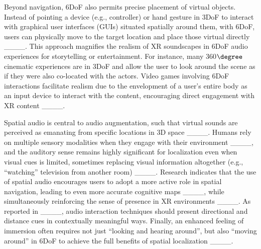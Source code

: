 Beyond navigation, 6DoF also permits precise placement of virtual objects. Instead of pointing a device (e.g., controller) or hand gesture in 3DoF to interact with graphical user interfaces (GUIs) situated spatially around them, with 6DoF, users can physically move to the target location and place those virtual directly ____. This approach magnifies the realism of XR soundscapes in 6DoF audio experiences for storytelling or entertainment. 
For instance, many 360$\degree$ cinematic experiences are in 3DoF and allow the user to look around the scene as if they were also co-located with the actors. Video games involving 6DoF interactions facilitate realism due to the envelopment of a user's entire body as an input device to interact with the content, encouraging direct engagement with XR content ____.  

Spatial audio is central to audio augmentation, such that virtual sounds are perceived as emanating from specific locations in 3D space ____. Humans rely on multiple sensory modalities when they engage with their environment ____, and the auditory sense remains highly significant for localization even when visual cues is limited, sometimes replacing visual information altogether (e.g., \enquote{watching} television from another room) ____. Research indicates that the use of spatial audio encourages users to adopt a more active role in spatial navigation, leading to even more accurate cognitive maps ____, while simultaneously reinforcing the sense of presence in XR environments ____. As reported in ____, audio interaction techniques should present directional and distance cues in contextually meaningful ways. Finally, an enhanced feeling of immersion often requires not just \enquote{looking and hearing around}, but also \enquote{moving around} in 6DoF to achieve the full benefits of spatial localization ____.


